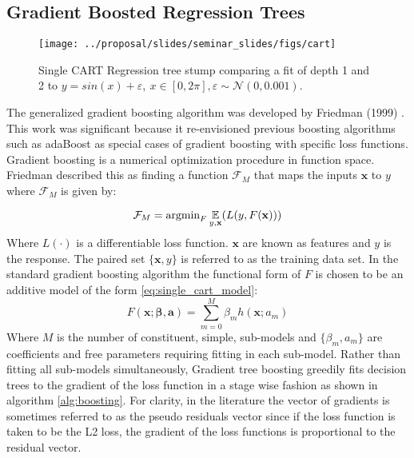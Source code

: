 \subsection{Gradient Boosted Regression Trees}

\begin{figure}[H]
    \centering
    \texttt{[image: ../proposal/slides/seminar\_slides/figs/cart]}
    \caption[Regression tree stump.]{Single CART Regression tree stump comparing a fit of depth 1 and 2 to $y=sin(x) + \varepsilon,\ x\in[0,2\pi], \varepsilon \sim \mathcal N(0,0.001)$.}
    \label{fig:cart}
\end{figure}

The generalized gradient boosting algorithm was developed by Friedman (1999)  \cite{friedman2001}.  This work was significant because it re-envisioned previous boosting algorithms such as adaBoost as special cases of gradient boosting with specific loss functions.  Gradient boosting is a numerical optimization procedure in function space.  Friedman described this as finding a function $\mathcal F_M$ that maps the inputs $\mathbf x$ to $y$ where $\mathcal F_M$ is given by:

\begin{equation}
\mathcal F_M = \text{argmin}_F \operatorname*{\mathbb{E}}_{y, \mathbf x} (L(y, F(\mathbf x)))
\end{equation}
Where $L(\cdot)$ is a differentiable loss function.  $\mathbf x$ are known as features and $y$ is the response.  The paired set $\{\mathbf x, y \}$ is referred to as the training data set.  In the standard gradient boosting algorithm the functional form of $F$ is chosen to be an additive model of the form \ref{eq:single_cart_model}:
\begin{equation}
F(\mathbf x; \mathbf{\beta}, \mathbf a) = \sum_{m=0}^M \beta_m h(\mathbf x; a_m)
\label{eq:single_cart_model}
\end{equation} 
Where $M$ is the number of constituent, simple, sub-models and $\{ \beta_m, a_m\}$ are coefficients and free parameters requiring fitting in each sub-model.
Rather than fitting all sub-models simultaneously, 
Gradient tree boosting greedily fits decision trees to the gradient of the loss function in a stage wise fashion as shown in algorithm \ref{alg:boosting}.  For clarity, in the literature the vector of gradients is sometimes referred to as the pseudo residuals vector since if the loss function is taken to be the L2 loss, the gradient of the loss functions is proportional to the residual vector.  

